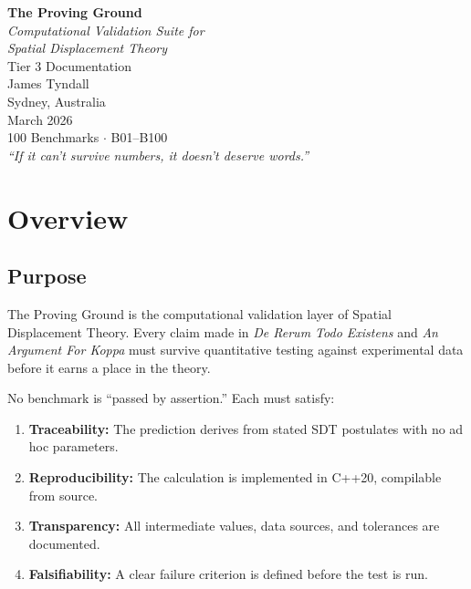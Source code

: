 \documentclass[12pt,a4paper]{report}
\begin{document}
\begin{titlepage}
\centering
\vspace*{4cm}
{\Huge\bfseries The Proving Ground\\[0.5cm]}
{\Large\itshape Computational Validation Suite for\\
Spatial Displacement Theory\\[2cm]}
{\large Tier 3 Documentation\\[1cm]}
{\Large James Tyndall\\[0.5cm]}
{\large Sydney, Australia\\[0.5cm]}
{\large March 2026\\[3cm]}
{\normalsize 100 Benchmarks $\cdot$ B01--B100\\[0.3cm]
\textit{``If it can't survive numbers, it doesn't deserve words.''}}
\end{titlepage}

\tableofcontents
\newpage


\chapter{Overview}

\section{Purpose}

The Proving Ground is the computational validation layer of Spatial Displacement Theory. Every claim made in \textit{De Rerum Todo Existens} and \textit{An Argument For Koppa} must survive quantitative testing against experimental data before it earns a place in the theory.

No benchmark is ``passed by assertion.'' Each must satisfy:
\begin{enumerate}
  \item \textbf{Traceability:} The prediction derives from stated SDT postulates with no ad hoc parameters.
  \item \textbf{Reproducibility:} The calculation is implemented in C++20, compilable from source.
  \item \textbf{Transparency:} All intermediate values, data sources, and tolerances are documented.
  \item \textbf{Falsifiability:} A clear failure criterion is defined before the test is run.
\end{enumerate}
\end{document}
